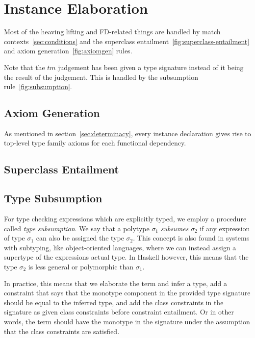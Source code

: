 \section{Instance Elaboration}
\label{sec:instance-elaboration}
Most of the heaving lifting and FD-related things are handled by match
contexts~\ref{sec:conditions} and the superclass
entailment~\ref{fig:superclass-entailment} and axiom
generation~\ref{fig:axiomgen} rules.

Note that the $tm$ judgement has been given a type signature instead of
it being the result of the judgement. This is handled by the subsumption
rule~\ref{fig:subsumption}.
\subsection{Axiom Generation}
As mentioned in section~\ref{sec:determinacy}, every instance declaration gives rise
to top-level type family axioms for each functional dependency.
\subsection{Superclass Entailment}


\subsection{Type Subsumption}
\label{sec:subsumption}
For type checking expressions which are explicitly typed, we employ a procedure
called \textit{type subsumption}. We say that a polytype $\sigma_1$
\textit{subsumes} $\sigma_2$ if any expression of type $\sigma_1$ can also be
assigned the type $\sigma_2$. This concept is also found in systems with
subtyping, like object-oriented languages, where we can instead assign a
supertype of the expressions actual type. In Haskell however, this means that
the type $\sigma_2$ is less general or polymorphic than $\sigma_1$.

In practice, this means that we elaborate the term and infer a type, add a
constraint that says that the monotype component in the provided type signature
should be equal to the inferred type, and add the class constraints in the
signature as given class constraints before constraint entailment. Or in other
words, the term should have the monotype in the signature under the assumption
that the class constraints are satisfied.


